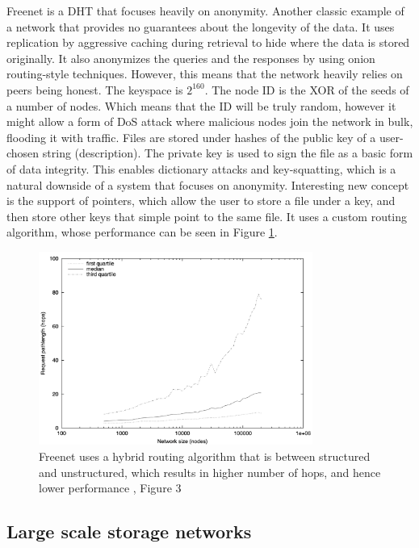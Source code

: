 Freenet \cite{freenet} is a DHT that focuses heavily on anonymity.
Another classic example of a network that provides no guarantees about the longevity of the data.
It uses replication by aggressive caching during retrieval to hide where the data is stored originally.
It also anonymizes the queries and the responses by using onion routing-style techniques.
However, this means that the network heavily relies on peers being honest.
The keyspace is $2^{160}$.
The node ID is the XOR of the seeds of a number of nodes.
Which means that the ID will be truly random, however it might allow a form of DoS attack
where malicious nodes join the network in bulk, flooding it with traffic.
Files are stored under hashes of the public key of a user-chosen string (description).
The private key is used to sign the file as a basic form of data integrity.
This enables dictionary attacks and key-squatting, which is a natural downside of a system
that focuses on anonymity.
Interesting new concept is the support of pointers, which allow the user to store a file under a key,
and then store other keys that simple point to the same file.
It uses a custom routing algorithm, whose performance can be seen in Figure \ref{fig:freenet-algo}.

\begin{figure}
    \centering
    \includegraphics[width=0.8\textwidth]{gfx/freenet-algo.png}
    \caption{Freenet uses a hybrid routing algorithm that is between structured and unstructured,
        which results in higher number of hops, and hence lower performance \cite{freenet}, Figure 3}
    \label{fig:freenet-algo}
\end{figure}

\subsection{Large scale storage networks}


